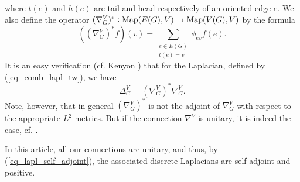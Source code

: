 \documentclass[12pt]{article}
\numberwithin{equation}{section}
\theoremstyle{theorem}
\theoremstyle{definition}
\theoremstyle{remark}
\newcommand{\laplcomp}{\Delta}
\begin{document}
	where $t(e)$ and $h(e)$ are tail and head respectively of an oriented edge $e$.
	We also define the operator $(\nabla^V_{G})^* : {\rm{Map}}(E(G), V) \to {\rm{Map}}(V(G), V)$ by the formula
	\begin{equation}
		((\nabla^V_{G})^* f)(v) = \sum_{\substack{e \in E(G) \\ t(e) = v}} \phi_{e v} f(e).
	\end{equation}
	It is an easy verification (cf. Kenyon \cite[\S 3.3]{KenyonFlatVecBun}) that for the Laplacian, defined by (\ref{eq_comb_lapl_tw}), we have
	\begin{equation}\label{eq_lapl_self_adjoint}
		\laplcomp_G^{V} = (\nabla^V_{G})^* \nabla^V_{G}.
	\end{equation}
	Note, however, that in general $(\nabla^V_{G})^*$ is not the adjoint of $\nabla^V_{G}$ with respect to the appropriate $L^2$-metrics. 
	But if the connection $\nabla^V$ is unitary, it is indeed the case, cf. \cite[\S 3.3]{KenyonFlatVecBun}.
	\par 
	In this article, all our connections are unitary, and thus, by (\ref{eq_lapl_self_adjoint}), the associated discrete Laplacians are self-adjoint and positive.

	
\end{document}
